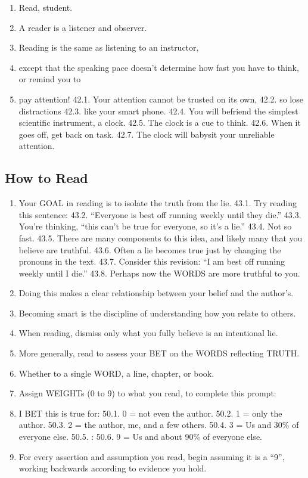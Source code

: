 \documentclass[
]{book}
\providecommand{\tightlist}{%
  \setlength{\itemsep}{0pt}\setlength{\parskip}{0pt}}
\begin{document}
\begin{enumerate}
\def\labelenumi{\arabic{enumi}.}
\setcounter{enumi}{37}
\tightlist
\item
  Read, student.
\item
  A reader is a listener and observer.
\item
  Reading is the same as listening to an instructor,
\item
  except that the speaking pace doesn't determine how fast you have to think, or
  remind you to
\item
  pay attention!
  42.1. Your attention cannot be trusted on its own,
  42.2. so lose distractions
  42.3. like your smart phone.
  42.4. You will befriend the simplest scientific instrument, a clock.
  42.5. The clock is a cue to think.
  42.6. When it goes off, get back on task.
  42.7. The clock will babysit your unreliable attention.
\end{enumerate}

\hypertarget{how-to-read}{%
\subsection{How to Read}\label{how-to-read}}

\begin{enumerate}
\def\labelenumi{\arabic{enumi}.}
\setcounter{enumi}{42}
\item
  Your GOAL in reading is to isolate the truth from the lie.
  43.1. Try reading this sentence:
  43.2. ``Everyone is best off running weekly until they die.''
  43.3. You're thinking, ``this can't be true for everyone, so it's a lie.''
  43.4. Not so fast.
  43.5. There are many components to this idea, and likely many that you believe
  are truthful.
  43.6. Often a lie becomes true just by changing the pronouns in the text.
  43.7. Consider this revision: ``I am best off running weekly until I die.''
  43.8. Perhaps now the WORDS are more truthful to you.
\item
  Doing this makes a clear relationship between your belief and the author's.
\item
  Becoming smart is the discipline of understanding how you relate to others.
\item
  When reading, dismiss only what you fully believe is an intentional lie.
\item
  More generally, read to assess your BET on the WORDS reflecting TRUTH.
\item
  Whether to a single WORD, a line, chapter, or book.
\item
  Assign WEIGHTs (0 to 9) to what you read, to complete this prompt:
\item
  I BET this is true for:
  50.1. 0 = not even the author.
  50.2. 1 = only the author.
  50.3. 2 = the author, me, and a few others.
  50.4. 3 = Us and 30\% of everyone else.
  50.5. :
  50.6. 9 = Us and about 90\% of everyone else.
\item
  For every assertion and assumption you read, begin assuming it is a ``9'', working
  backwards according to evidence you hold.
\end{enumerate}
\end{document}
